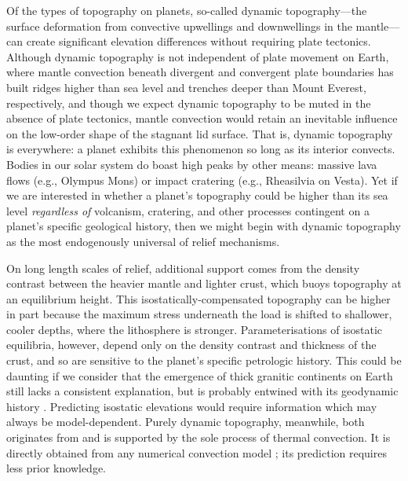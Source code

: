 
Of the types of topography on planets, so-called dynamic topography---the surface deformation from convective upwellings and downwellings in the mantle---can create significant elevation differences without requiring plate tectonics. Although dynamic topography is not independent of plate movement on Earth, where mantle convection beneath divergent and convergent plate boundaries has built ridges higher than sea level and trenches deeper than Mount Everest, respectively, and though we expect dynamic topography to be muted in the absence of plate tectonics, mantle convection would retain an inevitable influence on the low-order shape of the stagnant lid surface. That is, dynamic topography is everywhere: a planet exhibits this phenomenon so long as its interior convects. Bodies in our solar system do boast high peaks by other means: massive lava flows (e.g., Olympus Mons) or impact cratering (e.g., Rheasilvia on Vesta). Yet if we are interested in whether a planet's topography could be higher than its sea level \emph{regardless of} volcanism, cratering, and other processes contingent on a planet's specific geological history, then we might begin with dynamic topography as the most endogenously universal of relief mechanisms. 


On long length scales of relief, additional support comes from the density contrast between the heavier mantle and lighter crust, which buoys topography at an equilibrium height. This isostatically-compensated topography can be higher in part because the maximum stress underneath the load is shifted to shallower, cooler depths, where the lithosphere is stronger. Parameterisations of isostatic equilibria, however, depend only on the density contrast and thickness of the crust, and so are sensitive to the planet's specific petrologic history. This could be daunting if we consider that the emergence of thick granitic continents on Earth still lacks a consistent explanation, but is probably entwined with its geodynamic history \citep{lenardic_continental_2005,
korenaga_crustal_2018, honing_bifurcation_2019}. Predicting isostatic elevations would require information which may always be model-dependent. Purely dynamic topography, meanwhile, both originates from and is supported by the sole process of thermal convection. It is directly obtained from any numerical convection model \citep[e.g.,][]{mckenzie_surface_1977, kiefer_geoid_1992, kiefer_geoid_1998, huang_constraints_2013, arnould_scales_2018, lees_gravity_2020}; its prediction requires less prior knowledge.

